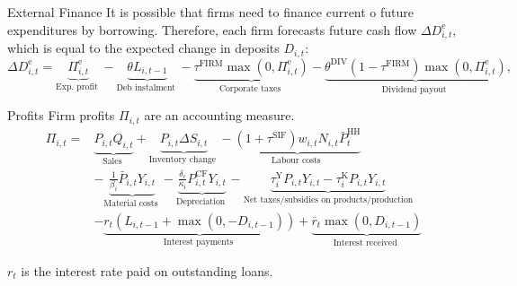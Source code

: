\documentclass[9pt]{beamer}
\begin{document}
\begin{frame}{External Finance}
    It is possible that firms need to finance current o future expenditures by borrowing.  Therefore, each firm forecasts future cash flow $\Delta D_{i,t}^{\mathrm{e}}$, which is equal to the expected change in deposits $D_{i,t}$:
\begin{equation}
    \scriptstyle \Delta D_{i,t}^{\mathrm{e}} =\underbrace{\Pi_{i,t}^{\mathrm{e}} }_{\text {Exp. profit }}-\underbrace{\theta L_{i,t-1} }_{\text {Deb instalment }}-\underbrace{\tau^{\mathrm{FIRM}} \max \left(0, \Pi_{i,t}^{\mathrm{e}} \right)}_{\text {Corporate taxes }}-\underbrace{\theta^{\mathrm{DIV}}\left(1-\tau^{\mathrm{FIRM}}\right) \max \left(0, \Pi_{i,t}^{\mathrm{e}} \right)}_{\text {Dividend payout }},
\end{equation}
    \hyperlink{ReturnOverview}{}

\end{frame}
\begin{frame}{Profits}
    Firm profits $\Pi_{i,t}$ are an accounting measure.
\begin{equation}
\begin{aligned}
\Pi_{i,t}= & \underbrace{P_{i,t} Q_{i,t}}_{\text {Sales }}+\underbrace{P_{i,t} \Delta S_{i,t}}_{\text {Inventory change }}-\underbrace{\left(1+\tau^{\mathrm{SIF}}\right) w_{i,t} N_{i,t} \bar{P}_t^{\mathrm{HH}} }_{\text {Labour costs }} \\
& -\underbrace{\frac{1}{\beta_i} \bar{P}_{i,t} Y_{i,t}}_{\text {Material costs }}-\underbrace{\frac{\delta_i}{\kappa_i} P_{i,t}^{\mathrm{CF}}  Y_{i,t}}_{\text {Depreciation }}-\underbrace{\tau_i^{\mathrm{Y}} P_{i,t} Y_{i,t}-\tau_i^{\mathrm{K}} P_{i,t} Y_{i,t}}_{\text {Net taxes/subsidies on products/production}} \\
& -\underbrace{r_t \left(L_{i,t-1}+\max \left(0,-D_{i,t-1}\right)\right)}_{\text {Interest payments }}+\underbrace{\bar{r}_t  \max \left(0, D_{i,t-1}\right)}_{\text {Interest received }}
\end{aligned}
\end{equation}

 $r_t$ is the interest rate paid on outstanding loans.
     \hyperlink{ReturnOverview}{}

\end{frame}
\end{document}
